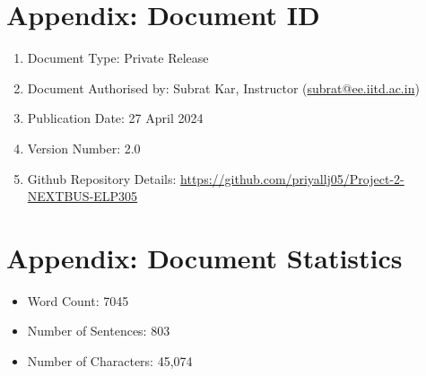 \documentclass[12pt]{article} %
\begin{document}
\begin{appendices}
\section{Appendix: Document ID}
   \begin{enumerate}
       \item Document Type: Private Release 
       \item Document Authorised by: Subrat Kar, Instructor (\href{mailto:subrat@ee.iitd.ac.in}{subrat@ee.iitd.ac.in})
       \item Publication Date: 27 April 2024
       \item Version Number: 2.0
       \item Github Repository Details: \href{https://github.com/priyallj05/Project-2-NEXTBUS-ELP305}{https://github.com/priyallj05/Project-2-NEXTBUS-ELP305}
   \end{enumerate}

\section{Appendix: Document Statistics}
    \begin{itemize}
       \item Word Count: 7045
       \item Number of Sentences: 803
       \item Number of Characters: 45,074
    \end{itemize}
    

\end{appendices}
\end{document}
